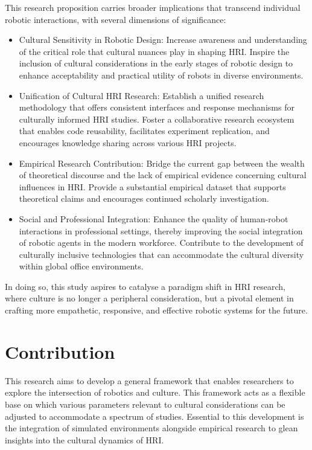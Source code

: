 This research proposition carries broader implications that transcend individual robotic interactions, with several dimensions of significance:
\begin{itemize}
\item Cultural Sensitivity in Robotic Design: Increase awareness and understanding of the critical role that cultural nuances play in shaping HRI. Inspire the inclusion of cultural considerations in the early stages of robotic design to enhance acceptability and practical utility of robots in diverse environments.
\item Unification of Cultural HRI Research: Establish a unified research methodology that offers consistent interfaces and response mechanisms for culturally informed HRI studies. Foster a collaborative research ecosystem that enables code reusability, facilitates experiment replication, and encourages knowledge sharing across various HRI projects.
\item Empirical Research Contribution: Bridge the current gap between the wealth of theoretical discourse and the lack of empirical evidence concerning cultural influences in HRI. Provide a substantial empirical dataset that supports theoretical claims and encourages continued scholarly investigation.
\item Social and Professional Integration: Enhance the quality of human-robot interactions in professional settings, thereby improving the social integration of robotic agents in the modern workforce. Contribute to the development of culturally inclusive technologies that can accommodate the cultural diversity within global office environments.
\end{itemize}
In doing so, this study aspires to catalyse a paradigm shift in HRI research, where culture is no longer a peripheral consideration, but a pivotal element in crafting more empathetic, responsive, and effective robotic systems for the future.

\section{Contribution}

This research aims to develop a general framework that enables researchers to explore the intersection of robotics and culture. This framework acts as a flexible base on which various parameters relevant to cultural considerations can be adjusted to accommodate a spectrum of studies. Essential to this development is the integration of simulated environments alongside empirical research to glean insights into the cultural dynamics of HRI.


